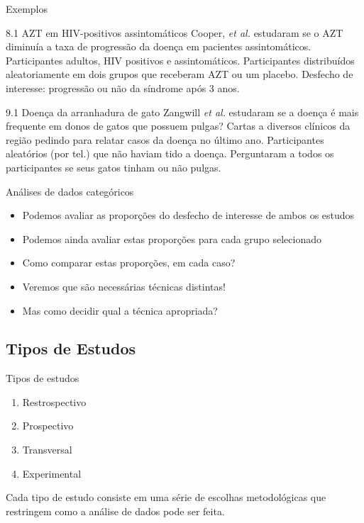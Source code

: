 \documentclass{beamer}
\begin{document}
\begin{frame}[label=exemplos8.1-9.1]{\scriptsize Exemplos}
  \begin{exampleblock}{8.1 AZT em HIV-positivos assintomáticos}
    Cooper, {\em et al.} estudaram se o AZT diminuía a taxa de progressão da doença em pacientes assintomáticos.
    Participantes adultos, HIV positivos e assintomáticos.
    Participantes distribuídos aleatoriamente em dois grupos que receberam AZT ou um placebo.
    Desfecho de interesse: progressão ou não da síndrome após 3 anos.
  \end{exampleblock}
  \begin{exampleblock}{9.1 Doença da arranhadura de gato}
    Zangwill {\em et al.} estudaram se a doença é mais frequente em donos de gatos que possuem pulgas?
    Cartas a diversos clínicos da região pedindo para relatar casos da doença no último ano.
    Participantes aleatórios (por tel.) que não haviam tido a doença.
    Perguntaram a todos os participantes se seus gatos tinham ou não pulgas.
  \end{exampleblock}
\end{frame}

\begin{frame}{\scriptsize Análises de dados categóricos}
  \begin{itemize}
  \item Podemos avaliar as proporções do desfecho de interesse de ambos os estudos
  \item Podemos ainda avaliar estas proporções para cada grupo selecionado
  \item Como comparar estas proporções, em cada caso?
  \item Veremos que são necessárias técnicas distintas!
  \item Mas como decidir qual a técnica apropriada?
  \end{itemize}
\end{frame}

\subsection{Tipos de Estudos}

\begin{frame}{\scriptsize Tipos de estudos}
  \begin{enumerate}
  \item Restrospectivo
  \item Prospectivo
  \item Transversal
  \item Experimental
  \end{enumerate}
  \begin{block}{}
    \footnotesize
    Cada tipo de estudo consiste em uma série de escolhas metodológicas que restringem como a análise de dados pode ser feita.
  \end{block}
\end{frame}
\end{document}
